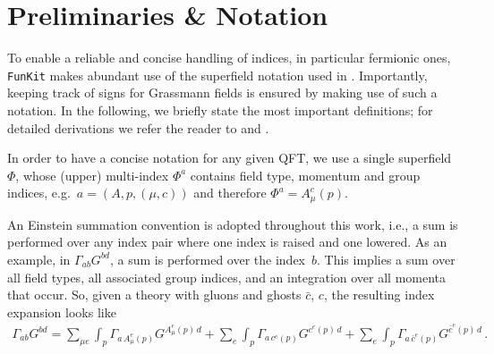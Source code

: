 \documentclass[preprint,10pt,sort&compress]{elsarticle}
\newcommand{\FunKit}{\texttt{FunKit}\xspace}
\begin{document}
\section{Preliminaries \& Notation}
\label{sec:Notation}



To enable a reliable and concise handling of indices, in particular fermionic ones, \FunKit makes abundant use of the superfield notation used in \cite{Pawlowski:2005xe}. Importantly, keeping track of signs for Grassmann fields is ensured by making use of such a notation. In the following, we briefly state the most important definitions; for detailed derivations we refer the reader to  and \cite{Pawlowski:2021tkk}.

In order to have a concise notation for any given QFT, we use a single superfield $\Phi$, whose (upper) multi-index $\Phi^a$ contains field type, momentum and group indices, e.g.\ $a = (A,p, (\mu, c))$ and therefore $\Phi^a = A_\mu^c(p)$.

An Einstein summation convention is adopted throughout this work, i.e., a sum is performed over any index pair where one index is raised and one lowered. As an example, in $\Gamma_{ab}G^{bd}$, a sum is performed over the index~$b$. This implies a sum over all field types, all associated group indices, and an integration over all momenta that occur. So, given a theory with gluons and ghosts $\bar{c}$, $c$, the resulting index expansion looks like
%
\begin{align*}
	\Gamma_{ab}G^{bd} = \sum_{\mu e}\int_p\Gamma_{a\,A^e_{\mu}(p)}G^{A^e_{\mu}(p)\,d} + \sum_{e}\int_p\Gamma_{a\,c^e(p)}G^{c^e(p)\,d} + \sum_{e}\int_p\Gamma_{a\,\bar{c}^e(p)}G^{\bar{c}^e(p)\,d}\,.
\end{align*}
\end{document}
